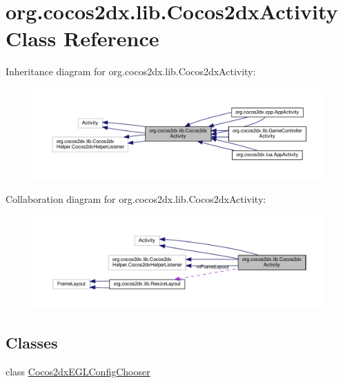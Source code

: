 \hypertarget{classorg_1_1cocos2dx_1_1lib_1_1Cocos2dxActivity}{}\section{org.\+cocos2dx.\+lib.\+Cocos2dx\+Activity Class Reference}
\label{classorg_1_1cocos2dx_1_1lib_1_1Cocos2dxActivity}


Inheritance diagram for org.\+cocos2dx.\+lib.\+Cocos2dx\+Activity\+:
\nopagebreak
\begin{figure}[H]
\begin{center}
\leavevmode
\includegraphics[width=350pt]{classorg_1_1cocos2dx_1_1lib_1_1Cocos2dxActivity__inherit__graph}
\end{center}
\end{figure}


Collaboration diagram for org.\+cocos2dx.\+lib.\+Cocos2dx\+Activity\+:
\nopagebreak
\begin{figure}[H]
\begin{center}
\leavevmode
\includegraphics[width=350pt]{classorg_1_1cocos2dx_1_1lib_1_1Cocos2dxActivity__coll__graph}
\end{center}
\end{figure}
\subsection*{Classes}
\begin{DoxyCompactItemize}
\item 
class \hyperlink{classorg_1_1cocos2dx_1_1lib_1_1Cocos2dxActivity_1_1Cocos2dxEGLConfigChooser}{Cocos2dx\+E\+G\+L\+Config\+Chooser}
\end{DoxyCompactItemize}
